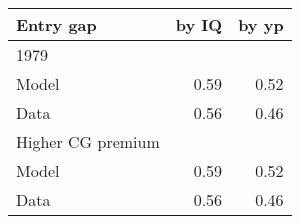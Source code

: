 \begin{tabular}{lrr}
\hline
Entry gap & by IQ  & by yp  \\ 
\hline
1979 &   &   \\ 
Model & 0.59  & 0.52  \\ 
Data & 0.56  & 0.46  \\ 
Higher CG premium &   &   \\ 
Model & 0.59  & 0.52  \\ 
Data & 0.56  & 0.46  \\ 
\hline
\end{tabular}%
